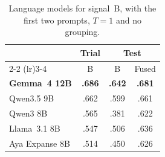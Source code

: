 \documentclass[11pt]{article}
\begin{document}
\begin{table}[hb]
\centering
\small
\setlength{\tabcolsep}{3pt}
\begin{tabular}{lccc}
\toprule
 & Trial & \multicolumn{2}{c}{Test} \\
\cmidrule(lr){2-2} \cmidrule(lr){3-4}
 & B & B & Fused \\
\midrule
\textbf{Gemma~4 12B} & \textbf{.686} & \textbf{.642} & \textbf{.681} \\ %
Qwen3.5 9B           & .662 & .599 & .661 \\ %
Qwen3 8B             & .565 & .381 & .622 \\ %
Llama~3.1 8B         & .547 & .506 & .636 \\ %
Aya Expanse 8B       & .514 & .450 & .626 \\ %
\bottomrule
\end{tabular}
\caption{Language models for signal~B, with the first two prompts, $T = 1$ and no grouping.}
\label{tab:llms}
\end{table}
\end{document}
